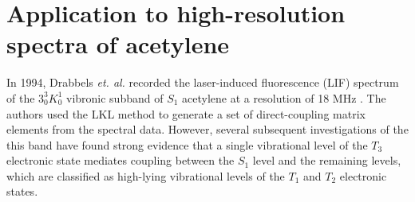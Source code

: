 \documentclass[12pt]{mitthesis}
\newcommand{\TODO} [1]{\textcolor{magenta}{\textbf{TODO:} #1}}
\newcommand{\POINT}[1]{\textcolor{magenta}{\emph{#1}}}
\begin{document}







\section{Application to high-resolution spectra of acetylene}

In 1994, Drabbels \emph{et. al.} recorded the laser-induced
fluorescence (LIF) spectrum of the $3^3_0K^1_0$ vibronic subband of
$S_1$ acetylene at a resolution of 18 MHz \cite{drabbels94}.  The
authors used the LKL method to generate a set of direct-coupling
matrix elements from the spectral data.  However, several subsequent
investigations of the this band have found strong evidence that a
single vibrational level of the $T_3$ electronic state mediates coupling
between the $S_1$ level and the remaining levels, which are classified
as high-lying vibrational levels of the $T_1$ and $T_2$ electronic
states.
\end{document}
